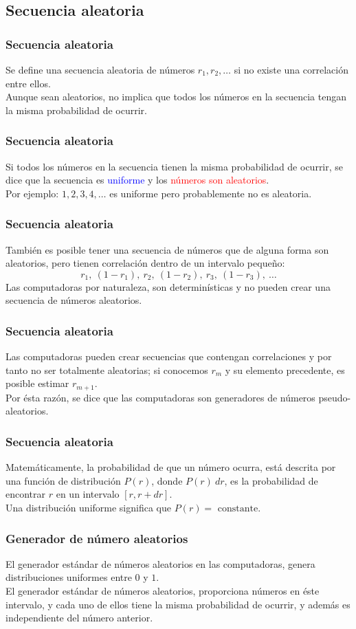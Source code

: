 \subsection{Secuencia aleatoria}
\begin{frame}
\frametitle{Secuencia aleatoria}
Se define una secuencia aleatoria de números $r_{1}, r_{2}, \ldots$ si no existe una correlación entre ellos.
\\
\bigskip
Aunque sean aleatorios, no implica que todos los números en la secuencia tengan la misma probabilidad de ocurrir.
\end{frame}
\begin{frame}
\frametitle{Secuencia aleatoria}
Si todos los números en la secuencia tienen la misma probabilidad de ocurrir, se dice que la secuencia es \textcolor{blue}{uniforme} y los \textcolor{red}{números son aleatorios}.
\\
\bigskip
Por ejemplo: $1, 2, 3, 4, \ldots$ es uniforme pero probablemente no es aleatoria.
\end{frame}
\begin{frame}
\frametitle{Secuencia aleatoria}
También es posible tener una secuencia de números que de alguna forma son aleatorios, pero tienen correlación dentro de un intervalo pequeño:
\[ r_{1},  \: (1 - r_{1} ), \: r_{2}, \: (1 - r_{2} ), \: r_{3}, \: (1 - r_{3} ), \: \ldots  \]
Las computadoras por naturaleza, son determinísticas y no pueden crear una secuencia de números aleatorios.
\end{frame}
\begin{frame}
\frametitle{Secuencia aleatoria}
Las computadoras pueden crear secuencias que contengan correlaciones y por tanto no ser totalmente aleatorias; si conocemos $r_{m}$ y su elemento precedente, es posible estimar $r_{m+1}$.
\\
\bigskip
Por ésta razón, se dice que las computadoras son generadores de números pseudo-aleatorios.
\end{frame}
\begin{frame}
\frametitle{Secuencia aleatoria}
Matemáticamente, la probabilidad de que un número ocurra, está descrita por una función de distribución $P(r)$, donde $P(r) \: dr$, es la probabilidad de encontrar $r$ en un intervalo $[r, r + dr]$.
\\
\bigskip
Una distribución uniforme significa que $P(r) = \mbox{ constante}$.
\end{frame}
\begin{frame}
\frametitle{Generador de número aleatorios}
El generador estándar de números aleatorios en las computadoras, genera distribuciones uniformes entre $0$ y $1$.
\\
\bigskip
El generador estándar de números aleatorios, proporciona números en éste intervalo, y cada uno de ellos tiene la misma probabilidad de ocurrir, y además es independiente del número anterior.
\end{frame}
